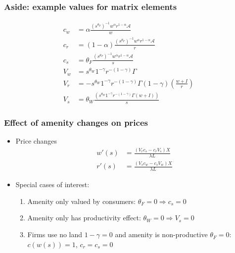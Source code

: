 \documentclass[11pt,notes=hide,aspectratio=169]{beamer}
\begin{document}
\begin{frame}
\frametitle{Aside: example values for matrix elements}
\begin{align*}
c_w &= \alpha \frac{(s^{\theta_F})^{-1}w^\alpha r^{1-\alpha} \mathcal{A}}{w} \\
c_r &= (1-\alpha) \frac{(s^{\theta_F})^{-1}w^\alpha r^{1-\alpha} \mathcal{A}}{r} \\
c_s &= \theta_F \frac{ (s^{\theta_F})^{-1}w^\alpha r^{1-\alpha} \mathcal{A}}{s} \\
V_w &=s^{\theta_W} 1^{-\gamma} r^{-(1-\gamma)}  \Gamma \\
V_r &= -s^{\theta_W} 1^{-\gamma} r^{-(1-\gamma)}\Gamma (1-\gamma)\left(\frac{w + I}{r}\right)   \\
V_s &= \theta_W \frac{\left(  s^{\theta_W} 1^{-\gamma} r^{-(1-\gamma)}\Gamma  \left(w + I\right) \right)}{s}
\end{align*}
\end{frame}
\begin{frame}
\frametitle{Effect of amenity changes on prices}
\begin{itemize}
\item Price changes
\begin{align*}
w'(s) &= \frac{(V_rc_s - c_rV_s) X}{ \lambda L} \\
r'(s) &= \frac{(V_sc_w - c_sV_w) X}{ \lambda L} 
\end{align*}
\item Special cases of interest:
\begin{enumerate}
\item Amenity only valued by consumers: $\theta_F=0 \Rightarrow c_s = 0$
\item Amenity only has productivity effect: $\theta_W=0 \Rightarrow  V_s = 0$
\item Firms use no land $1-\gamma=0$ and amenity is non-productive $\theta_F=0$: $c(w(s))=1$, $c_r = c_s = 0$
\end{enumerate}
\end{itemize}
\end{frame}
\end{document}
